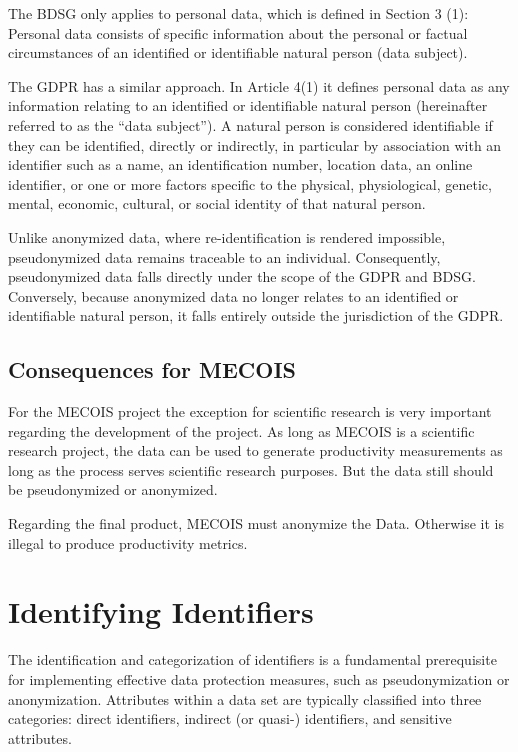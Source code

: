The \ac{BDSG} only applies to personal data, which is defined in Section 3 (1): Personal data consists of specific information about the personal or factual circumstances of an identified or identifiable natural person (data subject). \autocite[69]{daeubler2017glaeserne}

The \ac{GDPR} has a similar approach. In Article 4(1) it defines personal data as any information relating to an identified or identifiable natural person (hereinafter referred to as the “data subject”). A natural person is considered identifiable if they can be identified, directly or indirectly, in particular by association with an identifier such as a name, an identification number, location data, an online identifier, or one or more factors specific to the physical, physiological, genetic, mental, economic, cultural, or social identity of that natural person. \autocite[69]{daeubler2017glaeserne}

Unlike anonymized data, where re-identification is rendered impossible, pseudonymized data remains traceable to an individual. Consequently, pseudonymized data falls directly under the scope of the \ac{GDPR} and \ac{BDSG}. Conversely, because anonymized data no longer relates to an identified or identifiable natural person, it falls entirely outside the jurisdiction of the \ac{GDPR}.
\autocite[69]{daeubler2017glaeserne}

\subsection{Consequences for MECOIS}
\label{subsec:consequences_for_mecois}

For the MECOIS project the exception for scientific research is very important regarding the development of the project. As long as MECOIS is a scientific research project, the data can be used to generate productivity measurements as long as the process serves scientific research purposes. But the data still should be pseudonymized or anonymized.

Regarding the final product, MECOIS must anonymize the Data. Otherwise it is illegal to produce productivity metrics.


\section{Identifying Identifiers}

The identification and categorization of identifiers is a fundamental prerequisite for implementing effective data protection measures, such as pseudonymization or anonymization. Attributes within a data set are typically classified into three categories: direct identifiers, indirect (or quasi-) identifiers, and sensitive attributes.
\autocite[87--88, 131--132]{Krebs2022}
\autocite[9--10]{schwartmann2022praxisleitfaden}
\autocite[37]{gmdsbvd2024praxishilfe}

